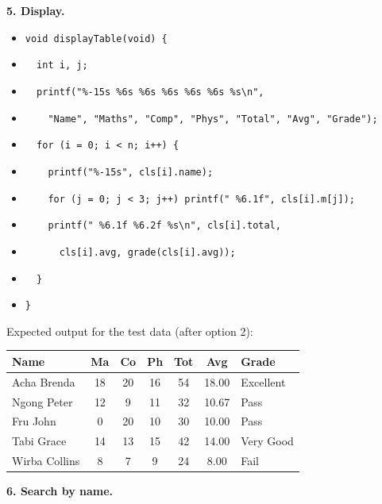 \documentclass[11pt]{article}
\begin{document}
\textbf{5. Display.}

\begin{itemize}
\item \texttt{void displayTable(void) \{}
\item \texttt{\ \ int i, j;}
\item \texttt{\ \ printf("\%-15s \%6s \%6s \%6s \%6s \%6s \%s\textbackslash{}n",}
\item \texttt{\ \ \ \ "Name", "Maths", "Comp", "Phys", "Total", "Avg", "Grade");}
\item \texttt{\ \ for (i = 0; i < n; i++) \{}
\item \texttt{\ \ \ \ printf("\%-15s", cls[i].name);}
\item \texttt{\ \ \ \ for (j = 0; j < 3; j++) printf(" \%6.1f", cls[i].m[j]);}
\item \texttt{\ \ \ \ printf(" \%6.1f \%6.2f \%s\textbackslash{}n", cls[i].total,}
\item \texttt{\ \ \ \ \ \ cls[i].avg, grade(cls[i].avg));}
\item \texttt{\ \ \}}
\item \texttt{\}}
\end{itemize}

Expected output for the test data (after option 2):

\begin{center}
\begin{tabular}{|l|c|c|c|c|c|l|}
\hline
\rowcolor{popblueL} \textbf{Name} & \textbf{Ma} & \textbf{Co} & \textbf{Ph} & \textbf{Tot} & \textbf{Avg} & \textbf{Grade} \\
\hline
Acha Brenda & 18 & 20 & 16 & 54 & 18.00 & Excellent \\
\hline
Ngong Peter & 12 & 9 & 11 & 32 & 10.67 & Pass \\
\hline
Fru John & 0 & 20 & 10 & 30 & 10.00 & Pass \\
\hline
Tabi Grace & 14 & 13 & 15 & 42 & 14.00 & Very Good \\
\hline
Wirba Collins & 8 & 7 & 9 & 24 & 8.00 & Fail \\
\hline
\end{tabular}
\end{center}

\textbf{6. Search by name.}
\end{document}
